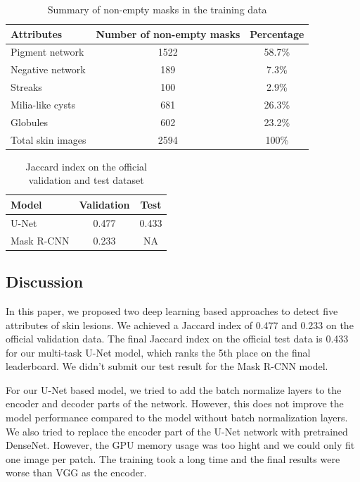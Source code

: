 \documentclass{article}
\begin{document}
\begin{table}
  \caption{Summary of non-empty masks in the training data}
  \label{summary-training}
  \centering
  \begin{tabular}{lcc}
    \toprule
    Attributes     &   Number of non-empty masks   & Percentage   \\
    \midrule
    Pigment network & 1522  & 58.7\%    \\
    Negative network     & 189 & 7.3\%      \\
    Streaks     & 100       & 2.9\%  \\
    Milia-like cysts & 681  & 26.3\%     \\
    Globules     & 602 & 23.2\%      \\
    \midrule
    Total skin images & 2594 & 100\% \\
    \bottomrule
  \end{tabular}
\end{table}


\begin{table}
  \caption{Jaccard index on the official validation and test dataset}
  \label{sample-table}
  \centering
  \begin{tabular}{lcc}
    \toprule
    Model     & Validation & Test   \\
    \midrule
    U-Net & 0.477   & 0.433  \\ 
    Mask R-CNN     & 0.233  & NA     \\
    \bottomrule
  \end{tabular}
\end{table}


\subsection{Discussion}
In this paper, we proposed two deep learning based approaches to detect five attributes of skin lesions. We achieved a Jaccard index of 0.477 and 0.233 on the official validation data. The final Jaccard index on the official test data is 0.433 for our multi-task U-Net model, which ranks the 5th place on the final leaderboard.  We didn't submit our test result for the Mask R-CNN model.

For our U-Net based model, we tried to add the batch normalize layers to the encoder and decoder parts of the network. However, this does not improve the model performance compared to the model without batch normalization layers. We also tried to replace the encoder part of the U-Net network with pretrained DenseNet. However, the GPU memory usage was too hight and we could only fit one image per patch. The training took a long time and the final results were worse than VGG as the encoder. 
\end{document}

